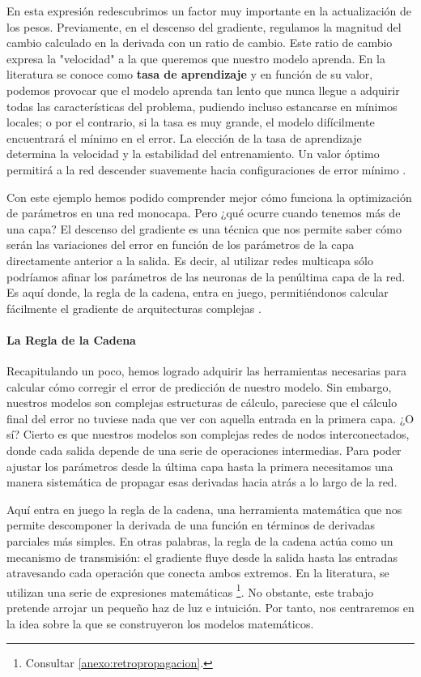 En esta expresión redescubrimos un factor muy importante en la actualización de los pesos. Previamente, en el descenso del gradiente, regulamos la magnitud del cambio calculado en la derivada con un ratio de cambio. Este ratio de cambio expresa la "velocidad" a la que queremos que nuestro modelo aprenda. En la literatura se conoce como \textbf{tasa de aprendizaje} y en función de su valor, podemos provocar que el modelo aprenda tan lento que nunca llegue a adquirir todas las características del problema, pudiendo incluso estancarse en mínimos locales; o por el contrario, si la tasa es muy grande, el modelo difícilmente encuentrará el mínimo en el error. La elección de la tasa de aprendizaje determina la velocidad y la estabilidad del entrenamiento. Un valor óptimo permitirá a la red descender suavemente hacia configuraciones de error mínimo \cite{dl_python__chollet_2021, dl_fundamentos__casas_roma_2020, dl__goodfellow_2016}.

Con este ejemplo hemos podido comprender mejor cómo funciona la optimización de parámetros en una red monocapa. Pero ¿qué ocurre cuando tenemos más de una capa? El descenso del gradiente es una técnica que nos permite saber cómo serán las variaciones del error en función de los parámetros de la capa directamente anterior a la salida. Es decir, al utilizar redes multicapa sólo podríamos afinar los parámetros de las neuronas de la penúltima capa de la red. Es aquí donde, la regla de la cadena, entra en juego, permitiéndonos calcular fácilmente el gradiente de arquitecturas complejas \cite{dl_python__chollet_2021}.


\paragraph{La Regla de la Cadena} \label{sec:regla_cadena}

Recapitulando un poco, hemos logrado adquirir las herramientas necesarias para calcular cómo corregir el error de predicción de nuestro modelo. Sin embargo, nuestros modelos son complejas estructuras de cálculo, pareciese que el cálculo final del error no tuviese nada que ver con aquella entrada en la primera capa. ¿O sí? Cierto es que nuestros modelos son complejas redes de nodos interconectados, donde cada salida depende de una serie de operaciones intermedias. Para poder ajustar los parámetros desde la última capa hasta la primera necesitamos una manera sistemática de propagar esas derivadas hacia atrás a lo largo de la red.

Aquí entra en juego la regla de la cadena, una herramienta matemática que nos permite descomponer la derivada de una función en términos de derivadas parciales más simples. En otras palabras, la regla de la cadena actúa como un mecanismo de transmisión: el gradiente fluye desde la salida hasta las entradas atravesando cada operación que conecta ambos extremos. En la literatura, se utilizan una serie de expresiones matemáticas \footnote{Consultar \ref{anexo:retropropagacion}.}. No obstante, este trabajo pretende arrojar un pequeño haz de luz e intuición. Por tanto, nos centraremos en la idea sobre la que se construyeron los modelos matemáticos.

